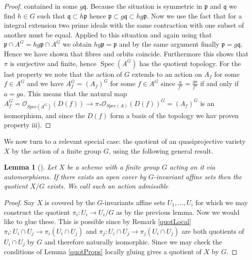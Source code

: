 \documentclass[11pt, a4paper, german]{article}
\theoremstyle{plain}
\newtheorem{lemma}[theorem]{Lemma}
\theoremstyle{definition}
\DeclareMathOperator{\Spec}{Spec}
\begin{document}
\begin{proof}
    contained in some $g\mathfrak{q}$. Because the situation is symmetric in $\mathfrak{p}$ and $\mathfrak{q}$ we find $h \in G$ such that
    $\mathfrak{q} \subset h\mathfrak{p}$ hence $\mathfrak{p} \subset g\mathfrak{q} \subset hg\mathfrak{p}$. Now we use the fact that
    for a integral extension two prime ideals with the same contraction with one subset of another must be equal. Applied to this
    situation and again using that $\mathfrak{p} \cap A^G = hg\mathfrak{p} \cap A^G$ we obtain $hg\mathfrak{p} = \mathfrak{p}$ and by the same
    argument finally $\mathfrak{p} = g\mathfrak{q}$. Hence we have shown that fibres and orbits coincide. Furthermore this shows that $\pi$ is
    surjective and finite, hence $\Spec(A^G)$ has the quotient topology.
    For the last property we note that the action of $G$ extends to an action on $A_f$ for some $f \in A^G$ and we have 
    $A^G_f = (A_f)^G$ for some $f \in A^G$ since $\frac{a}{f^n} = \frac{ga}{f^n}$ if and only if $a = ga$. This means that the natural
    map $A^G_f = \mathcal{O}_{Spec(A^G)}(D(f)) \to \pi_*\mathcal{O}_{Spec(A)}(D(f))^G = (A_f)^G$ is an isomorphism, and since the $D(f)$ form
    a basis of the topology we hav proven property iii).
\end{proof}

We now turn to a relevant special case: the quotient of an quasiprojective variety $X$ by the action of a finite group $G$, using the following
general result.

\begin{lemma}[{\cite[Prop. 1.8]{SGA1}}]    
    Let $X$ be a scheme with a finite group $G$ acting on it via automorphisms. If there exists an open cover by $G$-invariant affine sets
    then the quotient $X/G$ exists.
    We call such an action \emph{admissible}
\end{lemma}
\begin{proof}
    Say $X$ is covered by the $G$-invariants affine sets $U_1,\dots,U_i$ for which we may construct the quotient $\pi_i \colon U_i \to U_i/G$ 
    as by the previous lemma. Now we would like to glue these. This is possible since by Remark \ref{quotLocal} 
$\pi_i \colon U_i \cap U_j \to \pi_i(U_i \cap U_j)$ and $\pi_j \colon U_i \cap U_j \to \pi_j(U_i \cap U_j)$ are both quotients of $U_i \cap U_j$
    by $G$ and therefore naturally isomorphic. Since we may check the conditions of Lemma \ref{quotProps} locally gluing gives a quotient of 
    $X$ by $G$.
\end{proof}
\end{document}
